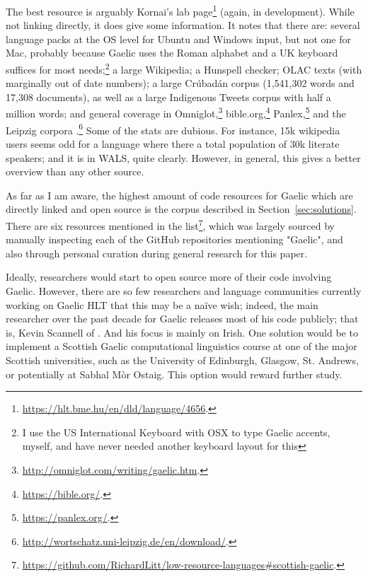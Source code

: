 The best resource is arguably Kornai's lab page\footnote{\href{https://hlt.bme.hu/en/dld/language/4656}{https://hlt.bme.hu/en/dld/language/4656}. } (again, in development). While not linking directly, it does give some information. It notes that there are: several language packs at the OS level for Ubuntu and Windows input, but not one for Mac, probably because Gaelic uses the Roman alphabet and a UK keyboard suffices for most needs;\footnote{I use the US International Keyboard with OSX to type Gaelic accents, myself, and have never needed another keyboard layout for this} a large Wikipedia; a Hunspell checker; OLAC texts (with marginally out of date numbers); a large Cr\'ubad\'an corpus (1,541,302 words and 17,308 documents), as well as a large Indigenous Tweets corpus with half a million words; and general coverage in Omniglot,\footnote{\href{http://omniglot.com/writing/gaelic.htm}{http://omniglot.com/writing/gaelic.htm}. } bible.org,\footnote{\href{https://bible.org/}{https://bible.org/}. } Panlex,\footnote{\href{https://panlex.org/}{https://panlex.org/}. } and the Leipzig corpora \citep{goldhahn2012building}.\footnote{\href{http://wortschatz.uni-leipzig.de/en/download/}{http://wortschatz.uni-leipzig.de/en/download/}. } Some of the stats are dubious. For instance, 15k wikipedia users seems odd for a language where there a total population of 30k literate speakers; and it is in WALS, quite clearly. However, in general, this gives a better overview than any other source.

As far as I am aware, the highest amount of code resources for Gaelic which are directly linked and open source is the corpus described in Section~\ref{sec:solutions}. There are six resources mentioned in the list\footnote{\href{https://github.com/RichardLitt/low-resource-languages\#scottish-gaelic}{https://github.com/RichardLitt/low-resource-languages\#scottish-gaelic}. }, which was largely sourced by manually inspecting each of the GitHub repositories mentioning "Gaelic", and also through personal curation during general research for this paper.

Ideally, researchers would start to open source more of their code involving Gaelic. However, there are so few researchers and language communities currently working on Gaelic HLT that this may be a na\"{i}ve wish; indeed, the main researcher over the past decade for Gaelic releases most of his code publicly; that is, Kevin Scannell of \citet{scannell2007crubadan}. And his focus is mainly on Irish. One solution would be to implement a Scottish Gaelic computational linguistics course at one of the major Scottish universities, such as the University of Edinburgh, Glasgow, St. Andrews, or potentially at Sabhal M\`or Ostaig. This option would reward further study.

